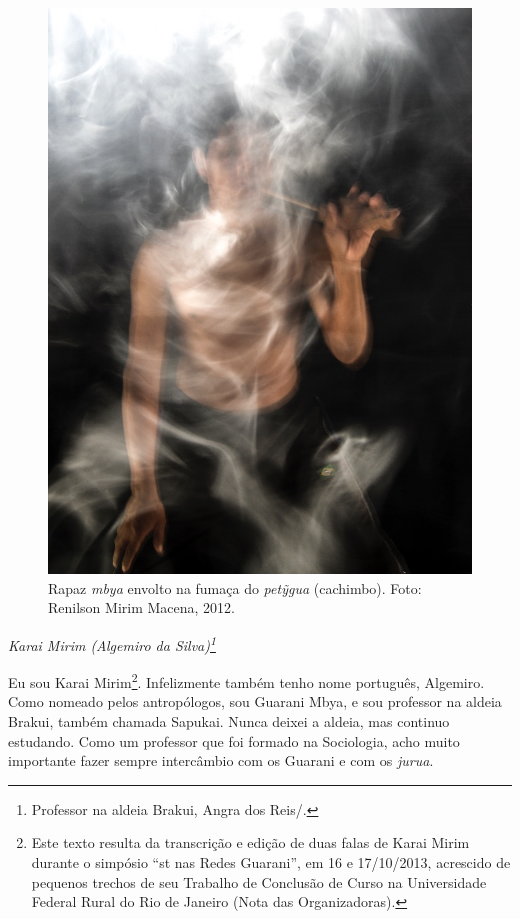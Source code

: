 \begin{vplace}
 \begin{figure}[H]
  \centering
 \includegraphics[width=\textwidth]{./img/GUARANIS-img3.jpg}	
  \hfill
  \caption{Rapaz \emph{mbya} envolto na fumaça do \emph{petỹgua} (cachimbo). Foto: Renilson
Mirim Macena, 2012.}
\end{figure}
\end{vplace}



\@openrighttrue\makeatother
\begin{flushright}
\emph{Karai Mirim (Algemiro da Silva)\footnote{Professor na aldeia Brakui,
Angra dos Reis/.}}
\end{flushright} 

\noindent
Eu sou Karai Mirim\footnote{Este texto resulta da transcrição e edição
de duas falas de Karai Mirim durante o simpósio ``st nas Redes
Guarani'', em 16 e 17/10/2013, acrescido de pequenos trechos de seu
Trabalho de Conclusão de Curso na Universidade Federal Rural do Rio de
Janeiro (Nota das Organizadoras).}. Infelizmente também tenho nome
português, Algemiro. Como nomeado pelos antropólogos, sou Guarani Mbya,
e sou professor na aldeia Brakui, também chamada Sapukai. Nunca deixei
a aldeia, mas continuo estudando. Como um professor que foi formado na
Sociologia, acho muito importante fazer sempre intercâmbio com os
Guarani e com os \emph{jurua}.

